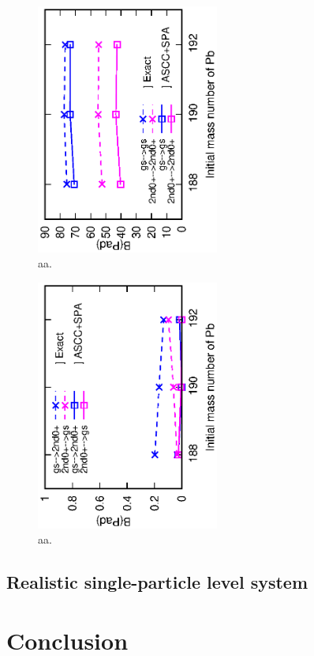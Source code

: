 \documentclass[%
superscriptaddress,
showpacs,
nofootinbib,
amsmath,amssymb,
aps,
prc,
twocolumn,
floatfix ]%
{revtex4-1}
\begin{document}
\begin{figure}[t]
 \begin{center}
  \includegraphics[width=60mm,angle=-90]{Pbintra_trans.eps}
 \end{center}
 \captionsetup{labelformat=empty,labelsep=none}
	\caption{aa.
}
 \label{PbPad}
\end{figure}

\begin{figure}[t]
 \begin{center}
  \includegraphics[width=60mm,angle=-90]{Pbinter_trans.eps}
 \end{center}
 \captionsetup{labelformat=empty,labelsep=none}
	\caption{aa.
}
 \label{PbPad}
\end{figure}

\subsection{Realistic single-particle level system}

\section{Conclusion}
\end{document}
